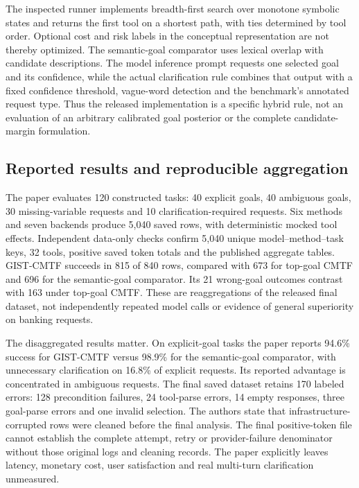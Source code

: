 The inspected runner implements breadth-first search over monotone symbolic
states and returns the first tool on a shortest path, with ties determined by
tool order. Optional cost and risk labels in the conceptual representation
are not thereby optimized. The semantic-goal comparator uses lexical overlap
with candidate descriptions. The model inference prompt requests one selected
goal and its confidence, while the actual clarification rule combines that
output with a fixed confidence threshold, vague-word detection and the
benchmark's annotated request type. Thus the released implementation is a
specific hybrid rule, not an evaluation of an arbitrary calibrated goal
posterior or the complete candidate-margin formulation.
\citep{exec23_gist_sources}

\subsection{Reported results and reproducible aggregation}
\label{exec23:gist-results}
The paper evaluates 120 constructed tasks: 40 explicit goals, 40 ambiguous
goals, 30 missing-variable requests and 10 clarification-required requests.
Six methods and seven backends produce 5,040 saved rows, with deterministic
mocked tool effects. Independent data-only checks confirm 5,040 unique
model--method--task keys, 32 tools, positive saved token totals and the
published aggregate tables. GIST-CMTF succeeds in 815 of 840 rows, compared
with 673 for top-goal CMTF and 696 for the semantic-goal comparator. Its
21 wrong-goal outcomes contrast with 163 under top-goal CMTF. These are
reaggregations of the released final dataset, not independently repeated
model calls or evidence of general superiority on banking requests.
\citep{exec23_gist_paper,exec23_gist_sources,exec23_gist_reference}

The disaggregated results matter. On explicit-goal tasks the paper reports
94.6\% success for GIST-CMTF versus 98.9\% for the semantic-goal comparator,
with unnecessary clarification on 16.8\% of explicit requests. Its reported
advantage is concentrated in ambiguous requests. The final saved dataset
retains 170 labeled errors: 128 precondition failures, 24 tool-parse errors,
14 empty responses, three goal-parse errors and one invalid selection.
The authors state that infrastructure-corrupted rows were cleaned before the
final analysis. The final positive-token file cannot establish the complete
attempt, retry or provider-failure denominator without those original logs
and cleaning records. The paper explicitly leaves latency, monetary cost,
user satisfaction and real multi-turn clarification unmeasured.
\citep{exec23_gist_paper,exec23_gist_sources,exec23_gist_reference}

